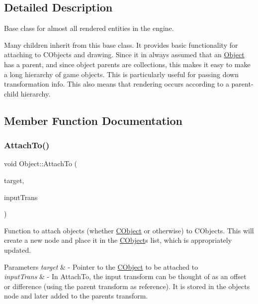 \subsection{Detailed Description}
Base class for almost all rendered entities in the engine. 

Many children inherit from this base class. It provides basic functionality for attaching to C\+Objects and drawing. Since it in always assumed that an \hyperlink{class_object}{Object} has a parent, and since object parents are collections, this makes it easy to make a long hierarchy of game objects. This is particularly useful for passing down transformation info. This also means that rendering occurs according to a parent-\/child hierarchy. 

\subsection{Member Function Documentation}
\hypertarget{class_object_ab0d9f0a189f0587d672cc21008b2be76}{}\label{class_object_ab0d9f0a189f0587d672cc21008b2be76} 
\subsubsection{\texorpdfstring{Attach\+To()}{AttachTo()}}
{\footnotesize\ttfamily void Object\+::\+Attach\+To (\begin{DoxyParamCaption}\item[{class \hyperlink{class_c_object}{C\+Object} $\ast$}]{target,  }\item[{\hyperlink{class_transform}{Transform}}]{input\+Trans }\end{DoxyParamCaption})}



Function to attach objects (whether \hyperlink{class_c_object}{C\+Object} or otherwise) to C\+Objects. This will create a new node and place it in the \hyperlink{class_c_object}{C\+Object}\textquotesingle{}s list, which is appropriately updated. 


\begin{DoxyParams}{Parameters}
{\em target} & -\/ Pointer to the \hyperlink{class_c_object}{C\+Object} to be attached to \\
\hline
{\em input\+Trans} & -\/ In Attach\+To, the input transform can be thought of as an offset or difference (using the parent transform as reference). It is stored in the object\textquotesingle{}s node and later added to the parent\textquotesingle{}s transform. \\
\hline
\end{DoxyParams}
\hypertarget{class_object_adeb7a19aaca51dbf093b37fd21c5e41f}{}\label{class_object_adeb7a19aaca51dbf093b37fd21c5e41f} 
